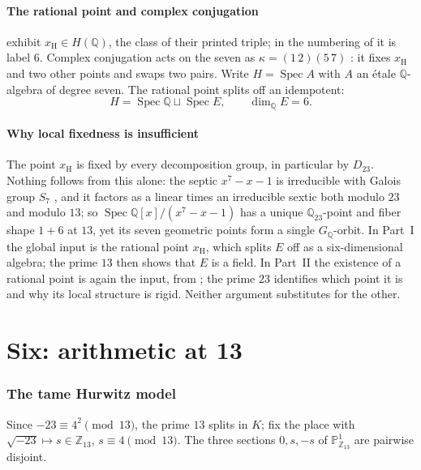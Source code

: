 \documentclass[11pt]{amsart}
\newcommand{\QQ}{\mathbb{Q}}
\newcommand{\ZZ}{\mathbb{Z}}
\newcommand{\PP}{\mathbb{P}}
\newcommand{\GQ}{G_{\QQ}}
\newcommand{\sqm}{\sqrt{-23}}
\newcommand{\kap}{\kappa}
\newcommand{\Spec}{\operatorname{Spec}}
\newcommand{\xH}{x_{\mathrm H}}
\theoremstyle{plain}
\theoremstyle{definition}
\begin{document}
\subsection{The rational point and complex conjugation}

\cite{HJLPPZ} exhibit $\xH\in H(\QQ)$, the class of their printed
triple; in the numbering of \cite{seven} it is label $6$. Complex
conjugation acts on the seven as $\kap=(1\,2)(5\,7)$ \cite[Thm.~3.1]{seven}: it
fixes $\xH$ and two other points and swaps two pairs. Write
$H=\Spec A$ with $A$ an \'etale $\QQ$-algebra of degree seven. The
rational point splits off an idempotent:
\[
  H=\Spec\QQ\sqcup\Spec E,\qquad \dim_\QQ E=6 .
\]

\subsection{Why local fixedness is insufficient}\label{sec:insufficient}

The point $\xH$ is fixed by every decomposition group, in particular
by $D_{23}$. Nothing follows from this alone: the septic
$x^7-x-1$ is irreducible with Galois group $S_7$ \cite{Osada}, and it
factors as a linear times an irreducible sextic both modulo $23$ and
modulo $13$; so $\Spec\QQ[x]/(x^7-x-1)$ has a unique $\QQ_{23}$-point
and fiber shape $1+6$ at $13$, yet its seven geometric points form a
single $\GQ$-orbit. In Part~I the global input is the rational point
$\xH$, which splits $E$ off as a six-dimensional algebra; the prime
$13$ then shows that $E$ is a field. In Part~II the existence of a
rational point is again the input, from \cite{HJLPPZ}; the prime $23$
identifies which point it is and why its local structure is rigid.
Neither argument substitutes for the other.

\part{Six: arithmetic at 13}

\section{The tame Hurwitz model}\label{sec:model}

Since $-23\equiv4^2\pmod{13}$, the prime $13$ splits in $K$; fix the
place with $\sqm\mapsto s\in\ZZ_{13}$, $s\equiv4\pmod{13}$. The three
sections $0,s,-s$ of $\PP^1_{\ZZ_{13}}$ are pairwise disjoint.
\end{document}
